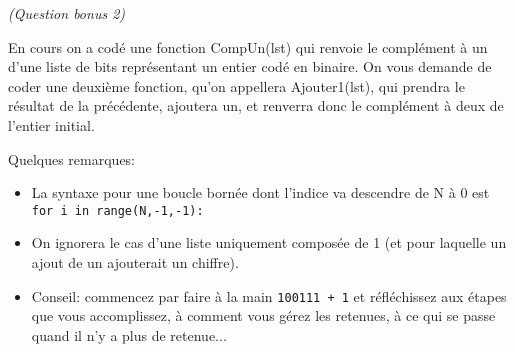 \documentclass[11pt,a4paper]{exam}
\begin{document}
\begin{questions}
\begin{spacing}{1}
\begin{solution}
            \end{solution} 
            
            \textit{(Question bonus 2)}
            
            En cours on a codé une fonction CompUn(lst) qui renvoie le complément à un d'une liste de bits représentant un entier codé en binaire. On vous demande de coder une deuxième fonction, qu'on appellera Ajouter1(lst), qui prendra le résultat de la précédente, ajoutera un, et renverra donc le complément à deux de l'entier initial.
            
            Quelques remarques:
            \begin{itemize}
            	\item La syntaxe pour une boucle bornée dont l'indice va descendre de N à 0 est \texttt{for i in range(N,-1,-1):}
            	\item On ignorera le cas d'une liste uniquement composée de 1 (et pour laquelle un ajout de un ajouterait un chiffre).
            	\item Conseil: commencez par faire à la main \texttt{100111 + 1} et réfléchissez aux étapes que vous accomplissez, à comment vous gérez les retenues, à ce qui se passe quand il n'y a plus de retenue...
            \end{itemize}
            
        \end{spacing}
    \end{questions}
\end{document}
